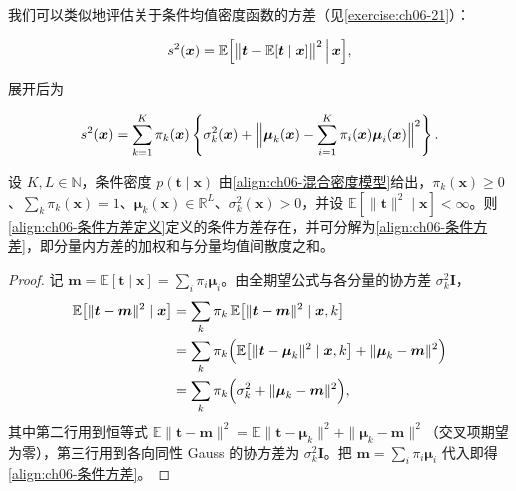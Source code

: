 \documentclass[../../main.tex]{subfiles}
\begin{document}
我们可以类似地评估关于条件均值密度函数的方差（见\cref{exercise:ch06-21}）：

\begin{align}
s^{2}(\boldsymbol{x})=\mathbb{E}\Bigl[\bigl\|\boldsymbol{t}-\mathbb{E}[\boldsymbol{t}\mid\boldsymbol{x}]\bigr\|^{2}\,\Big|\,\boldsymbol{x}\Bigr],
\label{align:ch06-条件方差定义}
\end{align}

展开后为

\begin{align}
s^{2}(\boldsymbol{x})=\sum_{k=1}^{K}\pi_k(\boldsymbol{x})\left\{\sigma_k^{2}(\boldsymbol{x})+\Bigl\|\boldsymbol{\mu}_k(\boldsymbol{x})-\sum_{i=1}^{K}\pi_i(\boldsymbol{x})\boldsymbol{\mu}_i(\boldsymbol{x})\Bigr\|^{2}\right\}.
\label{align:ch06-条件方差}
\end{align}

\begin{proposition}[条件方差分解]\label{proposition:ch06-条件方差}
设 $K,L\in\mathbb{N}$，条件密度 $p(\boldsymbol{t}\mid\boldsymbol{x})$ 由\eqref{align:ch06-混合密度模型}给出，$\pi_{k}(\boldsymbol{x})\geqslant0$、$\sum_{k}\pi_{k}(\boldsymbol{x})=1$、$\boldsymbol{\mu}_{k}(\boldsymbol{x})\in\mathbb{R}^{L}$、$\sigma_{k}^{2}(\boldsymbol{x})>0$，并设 $\mathbb{E}[\|\boldsymbol{t}\|^{2}\mid\boldsymbol{x}]<\infty$。则\eqref{align:ch06-条件方差定义}定义的条件方差存在，并可分解为\eqref{align:ch06-条件方差}，即分量内方差的加权和与分量均值间散度之和。
\end{proposition}

\begin{proof}
记 $\boldsymbol{m}=\mathbb{E}[\boldsymbol{t}\mid\boldsymbol{x}]=\sum_i\pi_i\boldsymbol{\mu}_i$。由全期望公式与各分量的协方差 $\sigma_k^{2}\boldsymbol{I}$，
\begin{align}
\mathbb{E}\bigl[\|\boldsymbol{t}-\boldsymbol{m}\|^{2}\mid\boldsymbol{x}\bigr]
&=\sum_{k}\pi_k\,\mathbb{E}\bigl[\|\boldsymbol{t}-\boldsymbol{m}\|^{2}\mid\boldsymbol{x},k\bigr]\nonumber\\
&=\sum_{k}\pi_k\Bigl(\mathbb{E}\bigl[\|\boldsymbol{t}-\boldsymbol{\mu}_k\|^{2}\mid\boldsymbol{x},k\bigr]+\|\boldsymbol{\mu}_k-\boldsymbol{m}\|^{2}\Bigr)\nonumber\\
&=\sum_{k}\pi_k\Bigl(\sigma_k^{2}+\|\boldsymbol{\mu}_k-\boldsymbol{m}\|^{2}\Bigr),
\end{align}
其中第二行用到恒等式 $\mathbb{E}\|\boldsymbol{t}-\boldsymbol{m}\|^{2}=\mathbb{E}\|\boldsymbol{t}-\boldsymbol{\mu}_k\|^{2}+\|\boldsymbol{\mu}_k-\boldsymbol{m}\|^{2}$（交叉项期望为零），第三行用到各向同性 Gauss 的协方差为 $\sigma_k^{2}\boldsymbol{I}$。把 $\boldsymbol{m}=\sum_i\pi_i\boldsymbol{\mu}_i$ 代入即得\eqref{align:ch06-条件方差}。
\end{proof}
\end{document}
